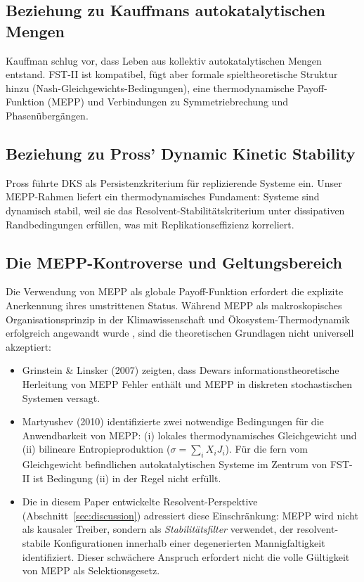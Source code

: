 \documentclass[12pt,a4paper]{article}
\theoremstyle{remark}
\begin{document}
\subsection{Beziehung zu Kauffmans autokatalytischen Mengen}

Kauffman \citep{Kauffman1993} schlug vor, dass Leben aus kollektiv autokatalytischen Mengen entstand. FST-II ist kompatibel, f\"ugt aber formale spieltheoretische Struktur hinzu (Nash-Gleichgewichts-Bedingungen), eine thermodynamische Payoff-Funktion (MEPP) und Verbindungen zu Symmetriebrechung und Phasen\"uberg\"angen.

\subsection{Beziehung zu Pross' Dynamic Kinetic Stability}

Pross \citep{Pross2012} f\"uhrte DKS als Persistenzkriterium f\"ur replizierende Systeme ein. Unser MEPP-Rahmen liefert ein thermodynamisches Fundament: Systeme sind dynamisch stabil, weil sie das Resolvent-Stabilit\"atskriterium unter dissipativen Randbedingungen erf\"ullen, was mit Replikationseffizienz korreliert.

\subsection{Die MEPP-Kontroverse und Geltungsbereich}

Die Verwendung von MEPP als globale Payoff-Funktion erfordert die explizite Anerkennung ihres umstrittenen Status. W\"ahrend MEPP als makroskopisches Organisationsprinzip in der Klimawissenschaft und \"Okosystem-Thermodynamik erfolgreich angewandt wurde \citep{MEPP2006}, sind die theoretischen Grundlagen nicht universell akzeptiert:

\begin{itemize}
\item Grinstein \& Linsker (2007) zeigten, dass Dewars informationstheoretische Herleitung von MEPP Fehler enth\"alt und MEPP in diskreten stochastischen Systemen versagt.
\item Martyushev (2010) identifizierte zwei notwendige Bedingungen f\"ur die Anwendbarkeit von MEPP: (i) lokales thermodynamisches Gleichgewicht und (ii) bilineare Entropieproduktion ($\sigma = \sum_i X_i J_i$). F\"ur die fern vom Gleichgewicht befindlichen autokatalytischen Systeme im Zentrum von FST-II ist Bedingung (ii) in der Regel nicht erf\"ullt.
\item Die in diesem Paper entwickelte Resolvent-Perspektive (Abschnitt~\ref{sec:discussion}) adressiert diese Einschr\"ankung: MEPP wird nicht als kausaler Treiber, sondern als \emph{Stabilit\"atsfilter} verwendet, der resolvent-stabile Konfigurationen innerhalb einer degenerierten Mannigfaltigkeit identifiziert. Dieser schw\"achere Anspruch erfordert nicht die volle G\"ultigkeit von MEPP als Selektionsgesetz.
\end{itemize}
\end{document}
